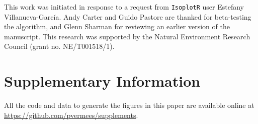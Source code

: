 \documentclass{article}
\begin{document}
This work was initiated in response to a request from
\texttt{IsoplotR} user Estefany Villanueva-Garc\'{i}a. Andy Carter and
Guido Pastore are thanked for beta-testing the algorithm, and Glenn
Sharman for reviewing an earlier version of the manuscript. This
research was supported by the Natural Environment Research Council
(grant no. NE/T001518/1).

\section*{Supplementary Information}

All the code and data to generate the figures in this paper are
available online at \url{https://github.com/pvermees/supplements}.

%
%

\end{document}
